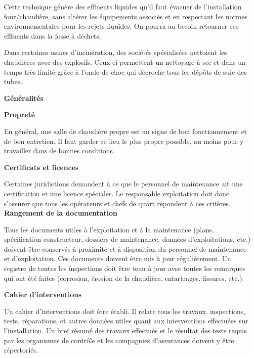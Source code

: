 Cette technique génère des effluents liquides qu’il faut évacuer de l’installation four/chaudière, sans altérer les équipements associés et en respectant les normes environnementales pour les rejets liquides. On pourra au besoin retourner ces effluents dans la fosse à déchets.
\vspace{0.3cm}

Dans certaines usines d’incinération, des sociétés spécialisées nettoient les chaudières avec des explosifs. Ceux-ci permettent un nettoyage à sec et dans un temps très limité grâce à l’onde de choc qui décroche tous les dépôts de suie des tubes.

\vspace{0.3cm}
\textbf{Généralités}
\vspace{0.3cm}

\textbf{Propreté}
\vspace{0.3cm}

En général, une salle de chaudière propre est un signe de bon fonctionnement et de bon entretien. Il faut garder ce lieu le plus propre possible, au moins pour y travailler dans de bonnes conditions.

\textbf{Certificats et licences}
\vspace{0.3cm}

Certaines juridictions demandent à ce que le personnel de maintenance ait une certification et une licence spéciales. Le responsable exploitation doit donc s’assurer que tous les opérateurs et chefs de quart répondent à ces critères.
\vspace{0.3cm}
\textbf{Rangement de la documentation}
\vspace{0.3cm}

Tous les documents utiles à l’exploitation et à la maintenance (plans, spécification constructeur, dossiers de maintenance, données d’exploitations, etc.) doivent être conservés à proximité et à disposition du personnel de maintenance et d’exploitation. Ces documents doivent être mis à jour régulièrement.
Un registre de toutes les inspections doit être tenu à jour avec toutes les remarques qui ont été faites (corrosion, érosion de la chaudière, entartrages, fissures, etc.).


\vspace{0.3cm}
\textbf{Cahier d’interventions}
\vspace{0.3cm}

Un cahier d’interventions doit être établi. Il relate tous les travaux, inspections, tests, réparations, et autres données utiles quant aux interventions effectuées sur l’installation. Un bref résumé des travaux effectués et le résultat des tests requis par les organismes de contrôle et les compagnies d’assurances doivent y être répertoriés.

